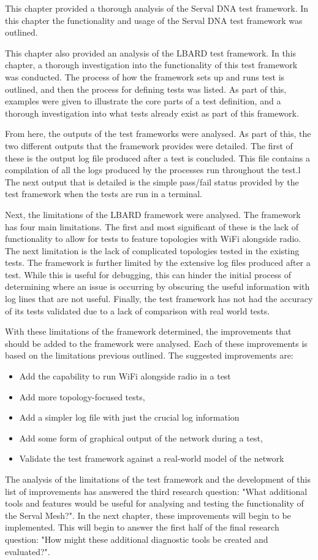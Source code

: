 This chapter provided a thorough analysis of the Serval DNA test framework.
In this chapter the functionality and usage of the Serval DNA test framework was outlined.

This chapter also provided an analysis of the LBARD test framework.
In this chapter, a thorough investigation into the functionality of this test framework was conducted.
The process of how the framework sets up and runs test is outlined, and then the process for defining tests was listed.
As part of this, examples were given to illustrate the core parts of a test definition, and a thorough investigation into what tests already exist as part of this framework.

From here, the outputs of the test frameworks were analysed. 
As part of this, the two different outputs that the framework provides were detailed.
The first of these is the output log file produced after a test is concluded.
This file contains a compilation of all the logs produced by the processes run throughout the test.l
The next output that is detailed is the simple pass/fail status provided by the test framework when the tests are run in a terminal.

Next, the limitations of the LBARD framework were analysed.
The framework has four main limitations.
The first and most significant of these is the lack of functionality to allow for tests to feature topologies with WiFi alongside radio.
The next limitation is the lack of complicated topologies tested in the existing tests.
The framework is further limited by the extensive log files produced after a test. 
While this is useful for debugging, this can hinder the initial process of determining where an issue is occurring by obscuring the useful information with log lines that are not useful.
Finally, the test framework has not had the accuracy of its tests validated due to a lack of comparison with real world tests.


With these limitations of the framework determined, the improvements that should be added to the framework were analysed.
Each of these improvements is based on the limitations previous outlined.
The suggested improvements are:
\begin{itemize}
    \item Add the capability to run WiFi alongside radio in a test
    \item Add more topology-focused tests,
    \item Add a simpler log file with just the crucial log information
    \item Add some form of graphical output of the network during a test,
    \item Validate the test framework against a real-world model of the network
\end{itemize}
The analysis of the limitations of the test framework and the development of this list of improvements has answered the third research question: "What additional tools and features would be useful for analysing and testing the functionality of the Serval Mesh?".
In the next chapter, these improvements will begin to be implemented.
This will begin to answer the first half of the final research question: "How might these additional diagnostic tools be created and evaluated?". 
